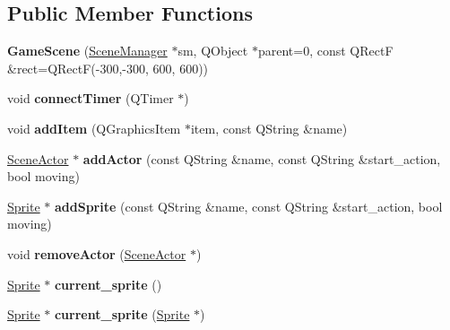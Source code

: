 \subsection*{Public Member Functions}
\begin{DoxyCompactItemize}
\item 
\mbox{\label{class_game_scene_abf292a17082d258a7c9a670c2eda50ea}} 
{\bfseries Game\+Scene} (\hyperlink{class_scene_manager}{Scene\+Manager} $\ast$sm, Q\+Object $\ast$parent=0, const Q\+RectF \&rect=Q\+RectF(-\/300,-\/300, 600, 600))
\item 
\mbox{\label{class_game_scene_a02a45a8bd424e6a09fb928b84abab216}} 
void {\bfseries connect\+Timer} (Q\+Timer $\ast$)
\item 
\mbox{\label{class_game_scene_a5472c7fdab73c3f2633861a2fc77fdfc}} 
void {\bfseries add\+Item} (Q\+Graphics\+Item $\ast$item, const Q\+String \&name)
\item 
\mbox{\label{class_game_scene_a51c98b3db623b2247afa8b6360d4a04b}} 
\hyperlink{class_actor}{Scene\+Actor} $\ast$ {\bfseries add\+Actor} (const Q\+String \&name, const Q\+String \&start\+\_\+action, bool moving)
\item 
\mbox{\label{class_game_scene_adfa6afce903509fba5324dd822365937}} 
\hyperlink{class_sprite}{Sprite} $\ast$ {\bfseries add\+Sprite} (const Q\+String \&name, const Q\+String \&start\+\_\+action, bool moving)
\item 
\mbox{\label{class_game_scene_a9ce725296c40edfad55477389d771b5a}} 
void {\bfseries remove\+Actor} (\hyperlink{class_actor}{Scene\+Actor} $\ast$)
\item 
\mbox{\label{class_game_scene_a7c837f21ae8de156ffe364f61512126d}} 
\hyperlink{class_sprite}{Sprite} $\ast$ {\bfseries current\+\_\+sprite} ()
\item 
\mbox{\label{class_game_scene_a583bc8b9dbeb21d89be15c1e9af85898}} 
\hyperlink{class_sprite}{Sprite} $\ast$ {\bfseries current\+\_\+sprite} (\hyperlink{class_sprite}{Sprite} $\ast$)
\item 
\mbox{\label{class_game_scene_a748a3207ff433972a6ea24d2dbbb089d}} 

\end{DoxyCompactItemize}
